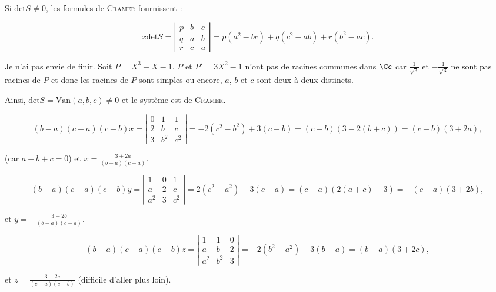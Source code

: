 {{Si $\mbox{det}S\neq0$, les formules de \textsc{Cramer} fournissent :

$$x\mbox{det}S=\left|
\begin{array}{ccc}
p&b&c\\
q&a&b\\
r&c&a
\end{array}
\right|=p(a^2-bc)+q(c^2-ab)+r(b^2-ac).$$

Je n'ai pas envie de finir.
Soit $P=X^3-X-1$. $P$ et $P'=3X^2-1$ n'ont pas de racines communes dans $\Cc$ car $\frac{1}{\sqrt{3}}$ et $-\frac{1}{\sqrt{3}}$ ne sont pas racines de $P$ et donc les racines de $P$ sont simples ou encore, $a$, $b$ et $c$ sont deux à deux distincts.

Ainsi, $\mbox{det}S=\mbox{Van}(a,b,c)\neq0$ et le système est de \textsc{Cramer}.

$$(b-a)(c-a)(c-b)x=\left|
\begin{array}{ccc}
0&1&1\\
2&b&c\\
3&b^2&c^2
\end{array}
\right|=-2(c^2-b^2)+3(c-b)=(c-b)(3-2(b+c))=(c-b)(3+2a),$$

(car $a+b+c=0$) et $x=\frac{3+2a}{(b-a)(c-a)}$.

$$(b-a)(c-a)(c-b)y=\left|
\begin{array}{ccc}
1&0&1\\
a&2&c\\
a^2&3&c^2
\end{array}
\right|=2(c^2-a^2)-3(c-a)=(c-a)(2(a+c)-3)=-(c-a)(3+2b),$$

et $y=-\frac{3+2b}{(b-a)(c-a)}$.

$$(b-a)(c-a)(c-b)z=\left|
\begin{array}{ccc}
1&1&0\\
a&b&2\\
a^2&b^2&3
\end{array}
\right|=-2(b^2-a^2)+3(b-a)=(b-a)(3+2c),$$

et $z=\frac{3+2c}{(c-a)(c-b)}$ (difficile d'aller plus loin).
}
}

